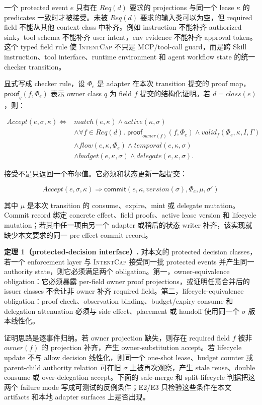 \documentclass[UTF8,a4paper,11pt]{ctexart}
\newcommand{\sys}{\textsc{IntentCap}\xspace}
\begin{document}
一个 protected event \(e\) 只有在 \(Req(d)\) 要求的 projections 与同一个 lease \(\kappa\) 的 predicates 一致时才被接受。未被 \(Req(d)\) 要求的输入类可以为空，但 required field 不能从其他 context class 中补齐。例如 instruction 不能补齐 authorized sink，tool schema 不能补齐 user intent，env evidence 不能补齐 approval token。这个 typed field rule 使 \sys 不只是 MCP/tool-call guard，而是跨 Skill instruction、tool interface、runtime environment 和 agent workflow state 的统一 checker transition。

显式写成 checker rule，设 \(\Phi_e\) 是 adapter 在本次 transition 提交的 proof map，\(\mathsf{proof}_q(f,\Phi_e)\) 表示 owner class \(q\) 为 field \(f\) 提交的结构化证明。若 \(d=class(e)\)，则：

\[
\begin{aligned}
Accept(e,\sigma,\kappa) \iff{}&
match(e,\kappa) \land active(\kappa,\sigma)\\
&\land \forall f\in Req(d).\;
  \mathsf{proof}_{owner(f)}(f,\Phi_e)\land
  valid_f(\Phi_e,\kappa,I,\Gamma)\\
&\land flow(e,\kappa,\Phi_e) \land temporal(e,\kappa,\sigma)\\
&\land budget(e,\kappa,\sigma) \land delegate(e,\kappa,\sigma).
\end{aligned}
\]

接受不是只返回一个布尔值。它必须和状态更新一起提交：

\[
Accept(e,\sigma,\kappa)\Rightarrow
\mathsf{commit}(e,\kappa,version(\sigma),\Phi_e,\mu,\sigma')
\]

其中 \(\mu\) 是本次 transition 的 consume、expire、mint 或 delegate mutation。Commit record 绑定 concrete effect、field proofs、active lease version 和 lifecycle mutation；若其中任一项由另一个 adapter 或稍后的状态 writer 补齐，该实现就缺少本文要求的同一 pre-effect commit record。

\textbf{定理 1（protected-decision interface）.}
对本文的 protected decision classes，若一个 enforcement layer 与 \sys 接受同一批 protected events 并产生同一 authority state，则它必须满足两个 obligation。第一，owner-equivalence obligation：它必须暴露 per-field owner proof projections，或证明任意合并后的 issuer classes 不会让非 owner 补齐 required field。第二，lifecycle-equivalence obligation：proof check、observation binding、budget/expiry consume 和 delegation attenuation 必须与 side effect、placement 或 handoff 使用同一个 \(\sigma\) 版本线性化。

证明思路是逐事件归纳。若 owner projection 缺失，则存在 required field \(f\) 被非 \(owner(f)\) 的 projection 补齐，产生 owner-substitution accept。若 lifecycle update 不与 allow decision 线性化，则同一个 one-shot lease、budget counter 或 parent-child authority relation 可在旧 \(\sigma\) 上被再次观察，产生 stale reuse、double consume 或 over-delegation accept。下面的 safe-merge 和 split-lifecycle 判据把这两个 failure mode 写成可测试的反例条件；E2/E3 只检验这些条件在本文 artifacts 和本地 adapter surfaces 上是否出现。
\end{document}

